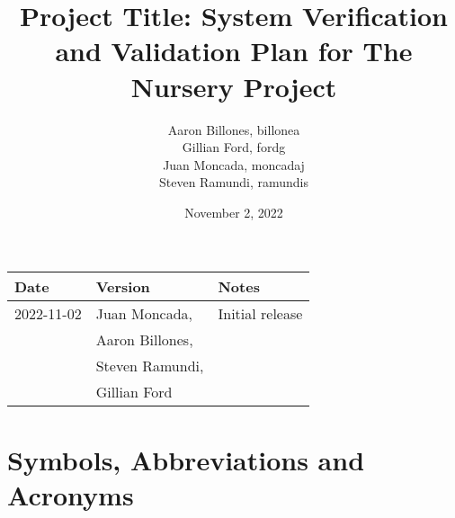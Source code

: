 \documentclass[12pt, titlepage]{article}
\begin{document}
\title{Project Title: System Verification and Validation Plan for The Nursery Project} 
\author{Aaron Billones, billonea\\Gillian Ford, fordg\\Juan Moncada, moncadaj\\Steven Ramundi, ramundis}

\date{November 2, 2022}


\maketitle
\thispagestyle{empty}




\begin{tabularx}{\textwidth}{p{3cm}p{4cm}X}
    \toprule {\bf Date} & {\bf Version} & {\bf Notes}\\
    \midrule
    2022-11-02 & Juan Moncada,& Initial release\\&Aaron Billones,\\&Steven Ramundi,\\&Gillian Ford \\
    
    \bottomrule
\end{tabularx}

\newpage

\tableofcontents

\listoftables
{}

\listoffigures
{}

\newpage

\section{Symbols, Abbreviations and Acronyms}
\end{document}
